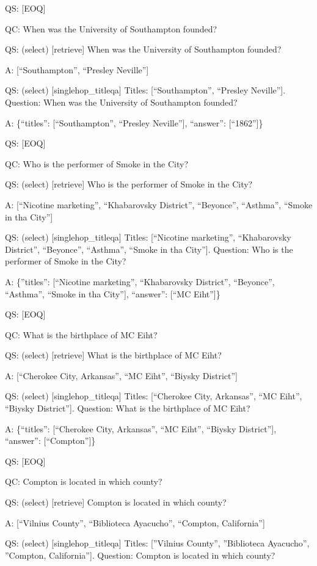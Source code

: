 \documentclass[
]{article}
\begin{document}
QS: {[}EOQ{]}

QC: When was the University of Southampton founded?

QS: (select) {[}retrieve{]} When was the University of Southampton
founded?

A: {[}``Southampton'', ``Presley Neville''{]}

QS: (select) {[}singlehop\_titleqa{]} Titles: {[}``Southampton'',
``Presley Neville''{]}. Question: When was the University of Southampton
founded?

A: \{``titles'': {[}``Southampton'', ``Presley Neville''{]}, ``answer'':
{[}``1862''{]}\}

QS: {[}EOQ{]}

QC: Who is the performer of Smoke in the City?

QS: (select) {[}retrieve{]} Who is the performer of Smoke in the City?

A: {[}``Nicotine marketing'', ``Khabarovsky District'', ``Beyonce'',
``Asthma'', ``Smoke in tha City''{]}

QS: (select) {[}singlehop\_titleqa{]} Titles: {[}``Nicotine marketing'',
``Khabarovsky District'', ``Beyonce'', ``Asthma'', ``Smoke in tha
City''{]}. Question: Who is the performer of Smoke in the City?

A: \{''titles'': {[}``Nicotine marketing'', ``Khabarovsky District'',
``Beyonce'', ``Asthma'', ``Smoke in tha City''{]}, ``answer'': {[}``MC
Eiht''{]}\}

QS: {[}EOQ{]}

QC: What is the birthplace of MC Eiht?

QS: (select) {[}retrieve{]} What is the birthplace of MC Eiht?

A: {[}``Cherokee City, Arkansas'', ``MC Eiht'', ``Biysky District''{]}

QS: (select) {[}singlehop\_titleqa{]} Titles: {[}``Cherokee City,
Arkansas'', ``MC Eiht'', ``Biysky District''{]}. Question: What is the
birthplace of MC Eiht?

A: \{``titles'': {[}``Cherokee City, Arkansas'', ``MC Eiht'', ``Biysky
District''{]}, ``answer'': {[}``Compton''{]}\}

QS: {[}EOQ{]}

QC: Compton is located in which county?

QS: (select) {[}retrieve{]} Compton is located in which county?

A: {[}``Vilnius County'', ``Biblioteca Ayacucho'', ``Compton,
California''{]}

QS: (select) {[}singlehop\_titleqa{]} Titles: {[}''Vilnius County'',
''Biblioteca Ayacucho'', ''Compton, California''{]}. Question: Compton
is located in which county?
\end{document}
